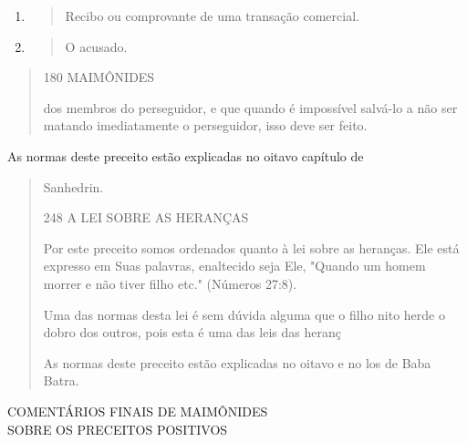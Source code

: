 \begin{enumerate}
\def\labelenumi{\arabic{enumi}.}
\setcounter{enumi}{227}
\item
  \begin{quote}
  Recibo ou comprovante de uma transação comercial.
  \end{quote}
\item
  \begin{quote}
  O acusado.
  \end{quote}
\end{enumerate}

\begin{quote}
180 MAIMÔNIDES

dos membros do perseguidor, e que quando é impossível salvá-lo a não ser
ma­tando imediatamente o perseguidor, isso deve ser feito.
\end{quote}

As normas deste preceito estão explicadas no oitavo capítulo de

\begin{quote}
Sanhedrin.

248 A LEI SOBRE AS HERANÇAS

Por este preceito somos ordenados quanto à lei sobre as heranças. Ele
está expresso em Suas palavras, enaltecido seja Ele, "Quando um homem
morrer e não tiver filho etc." (Números 27:8).

Uma das normas desta lei é sem dúvida alguma que o filho nito herde o
dobro dos outros, pois esta é uma das leis das heranç

As normas deste preceito estão explicadas no oitavo e no los de Baba
Batra.
\end{quote}

COMENTÁRIOS FINAIS DE MAIMÔNIDES\\
SOBRE OS PRECEITOS POSITIVOS

